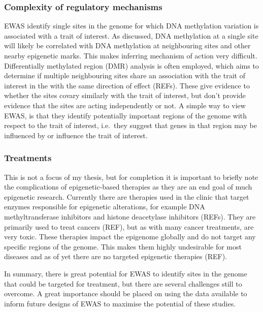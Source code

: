 \documentclass[11pt,twoside]{bristolthesis}
\begin{document}
\hypertarget{complexity-of-regulatory-mechanisms}{%
\subsubsection{Complexity of regulatory mechanisms}\label{complexity-of-regulatory-mechanisms}}

EWAS identify single sites in the genome for which DNA methylation variation is associated with a trait of interest. As discussed, DNA methylation at a single site will likely be correlated with DNA methylation at neighbouring sites and other nearby epigenetic marks. This makes inferring mechanism of action very difficult. Differentially methylated region (DMR) analysis is often employed, which aims to determine if multiple neighbouring sites share an association with the trait of interest in the with the same direction of effect (REFs). These give evidence to whether the sites covary similarly with the trait of interest, but don't provide evidence that the sites are acting independently or not. A simple way to view EWAS, is that they identify potentially important regions of the genome with respect to the trait of interest, i.e.~they suggest that genes in that region may be influenced by or influence the trait of interest.

\hypertarget{treatments}{%
\subsubsection{Treatments}\label{treatments}}

This is not a focus of my thesis, but for completion it is important to briefly note the complications of epigenetic-based therapies as they are an end goal of much epigenetic research. Currently there are therapies used in the clinic that target enzymes responsible for epigenetic alterations, for example DNA methyltransferase inhibitors and histone deacetylase inhibitors (REFs). They are primarily used to treat cancers (REF), but as with many cancer treatments, are very toxic. These therapies impact the epigenome globally and do not target any specific regions of the genome. This makes them highly undesirable for most diseases and as of yet there are no targeted epigenetic therapies (REF).

In summary, there is great potential for EWAS to identify sites in the genome that could be targeted for treatment, but there are several challenges still to overcome. A great importance should be placed on using the data available to inform future designs of EWAS to maximise the potential of these studies.
\end{document}

